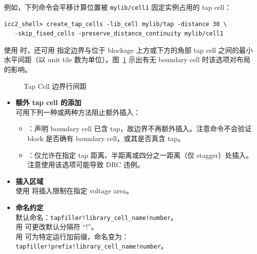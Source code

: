 例如，下列命令会平移计算位置被 \texttt{mylib/cell1} 固定实例占用的 tap cell：
\begin{lstlisting}
icc2_shell> create_tap_cells -lib_cell mylib/tap -distance 30 \
   -skip_fixed_cells -preserve_distance_continuity mylib/cell1
\end{lstlisting}

使用  时，还可用  指定边界与位于 blockage 上方或下方的角部 tap cell 之间的最小水平间距（以 unit tile 数为单位）。图~\ref{fig:tap-boundary-spacing} 示出有无 boundary cell 时该选项对布局的影响。

\begin{figure}[htbp]
\centering
{}
\caption{Tap Cell 边界行间距}
\label{fig:tap-boundary-spacing}
\end{figure}

\begin{itemize}
  \item \textbf{额外 tap cell 的添加}\\
        可用下列一种或两种方法阻止额外插入：
        \begin{itemize}
          \item {}：声明 boundary cell 已含 tap，故边界不再额外插入。注意命令不会验证 block 是否确有 boundary cell，或其是否真含 tap。
          \item \opt{-at\_distance\_only}：仅允许在指定 tap 距离、半距离或四分之一距离（仅 stagger）处插入。注意使用该选项可能导致 DRC 违例。
        \end{itemize}
  \item \textbf{插入区域}\\
        使用  将插入限制在指定 voltage area。
  \item \textbf{命名约定}\\
        默认命名：\texttt{tapfiller!library\_cell\_name!number}。\\
        用  可更改默认分隔符 ``!''。\\
        用  可为特定运行加前缀，命名变为：\texttt{tapfiller!prefix!library\_cell\_name!number}。
\end{itemize}

